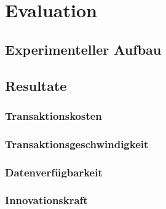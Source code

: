 \section{Evaluation}

\subsection{Experimenteller Aufbau}

\subsection{Resultate}

\subsubsection{Transaktionskosten}

\subsubsection{Transaktionsgeschwindigkeit}

\subsubsection{Datenverfügbarkeit}

\subsubsection{Innovationskraft}


\newpage
